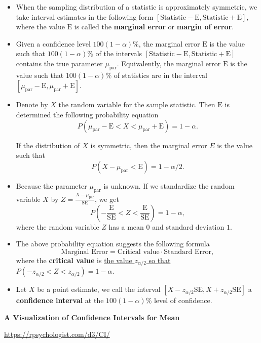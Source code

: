 \begin{itemize}
\item
  When the sampling distribution of a statistic is approximately
  symmetric, we take interval estimates in the following form
  \([\text{Statistic}- \text{E}, \text{Statistic}+ \text{E}],\) where
  the value \(\text{E}\) is called the \textbf{marginal error} or
  \textbf{margin of error}.
\item
  Given a confidence level \(100(1-\alpha)\%\), the marginal error
  \(\text{E}\) is the value such that \(100(1-\alpha)\%\) of the
  intervals \([\text{Statistic}- \text{E}, \text{Statistic}+ \text{E}]\)
  contains the true parameter \(\mu_\text{par}\). Equivalently, the
  marginal error \(\text{E}\) is the value such that \(100(1-\alpha)\%\)
  of statistics are in the interval
  \([\mu_\text{par}- \text{E}, \mu_\text{par}+ \text{E}]\).
\item
  Denote by \(X\) the random variable for the sample statistic. Then
  \(\text{E}\) is determined the following probability equation
  \[P(\mu_\text{par}-\text{E}< X < \mu_\text{par}+\text{E})=1-\alpha.\]

  If the distribution of \(X\) is symmetric, then the marginal error
  \(E\) is the value such that
  \[P(X-\mu_\text{par}<\text{E})=1-\alpha/2.\]
\item
  Because the parameter \(\mu_\text{par}\) is unknown. If we standardize
  the random variable \(X\) by \(Z=\frac{X-\mu_\text{par}}{\text{SE}}\),
  we get
  \[\textstyle P\left(-\frac{\text{E}}{\text{SE}}<Z<\frac{\text{E}}{\text{SE}}\right)=1-\alpha,\]
  where the random variable \(Z\) has a mean \(0\) and standard
  deviation \(1\).
\item
  The above probability equation suggests the following formula
  \[\textstyle \text{Marginal Error}=\text{Critical value}\cdot \text{Standard Error},\]
  where the \textbf{critical value} is
  \href{https://saylordotorg.github.io/text_introductory-statistics/s11-01-large-sample-estimation-of-a-p.html}{the
  value \(z_{\alpha/2}\) so that
  \(P(-z_{\alpha/2}<Z<z_{\alpha/2})=1-\alpha\)}.
\item
  Let \(X\) be a point estimate, we call the interval
  \([X-z_{\alpha/2}\text{SE}, X+z_{\alpha/2}\text{SE}]\) a
  \textbf{confidence interval} at the \(100(1-\alpha)\%\) level of
  confidence.
\end{itemize}

\textbf{A Visualization of Confidence Intervals for Mean}

\url{https://rpsychologist.com/d3/CI/}

